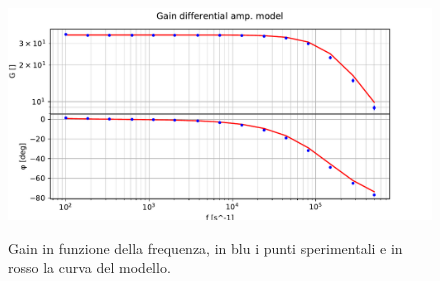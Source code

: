 \begin{figure}[h]
	\centering
    \includegraphics[width=\textwidth]{Figure_6.pdf}
    \label{fig:gain_model}
    \caption{Gain in funzione della frequenza, in blu i punti sperimentali e in rosso la curva del modello.}
\end{figure}
 
 